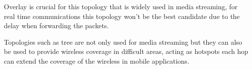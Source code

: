 Overlay is crucial for this topology that is widely used in media streaming, for real time communications this topology won't be the best candidate due to the delay when forwarding the packets.

Topologies such as tree are not only used for media streaming but they can also be used to provide wireless coverage in difficult areas, acting as hotspots each hop can extend the coverage of the wireless in mobile applications.


%
%
%

